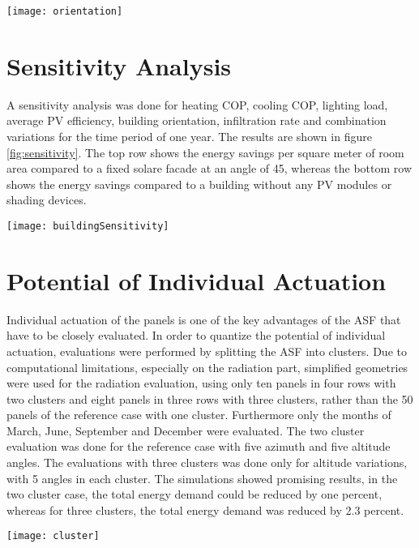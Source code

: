 	\begin{figure*}
		\begin{center}
		\texttt{[image: orientation]}
		\caption{Energy demand in dependence of building orientation. South facing facades perform best.}
		\label{fig:buildingOrientation}
		\end{center}
	\end{figure*}

\section{Sensitivity Analysis}

	A sensitivity analysis was done for heating COP, cooling COP, lighting load, average PV efficiency, building orientation, infiltration rate and combination variations for the time period of one year. The results are shown in figure \ref{fig:sensitivity}. The top row shows the energy savings per square meter of room area compared to a fixed solare facade at an angle of 45\degree, whereas the bottom row shows the energy savings compared to a building without any PV modules or shading devices. 

	\begin{figure*}
		\begin{center}
		\texttt{[image: buildingSensitivity]}
		\caption{Sensitivity analysis of energy savings during one year. From left to right, sensitivities on heating COP, cooling COP, lighting load, average PV efficiency, building orientation, combination variations and infiltration rate. Top row shows the energy savings compared to a fixed solar facade at a 45\degree altitude angle, the bottom row shows the energy savings compared to a room without shading or PV modules.}
		\label{fig:sensitivity}
		\end{center}
	\end{figure*}

\section{Potential of Individual Actuation}
	Individual actuation of the panels is one of the key advantages of the ASF that have to be closely evaluated. In order to quantize the potential of individual actuation, evaluations were performed by splitting the ASF into clusters. Due to computational limitations, especially on the radiation part, simplified geometries were used for the radiation evaluation, using only ten panels in four rows with two clusters and eight panels in three rows with three clusters, rather than the 50 panels of the reference case with one cluster. Furthermore only the months of March, June, September and December were evaluated. The two cluster evaluation was done for the reference case with five azimuth and five altitude angles. The evaluations with three clusters was done only for altitude variations, with 5 angles in each cluster. The simulations showed promising results, in the two cluster case, the total energy demand could be reduced by one percent, whereas for three clusters, the total energy demand was reduced by 2.3 percent. 

	\begin{figure*}
		\begin{center}
		\texttt{[image: cluster]}
		\caption{Cluster analysis of the ASF}
		\label{fig:sensitivity}
		\end{center}
	\end{figure*}